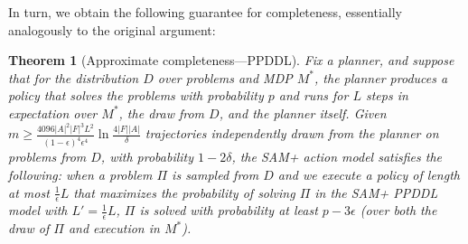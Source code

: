 \documentclass[letterpaper]{article} %
\newtheorem{theorem}{Theorem}
\begin{document}
In turn, we obtain the following guarantee for completeness, essentially analogously to the original argument:
\begin{theorem}[Approximate completeness---PPDDL]
\label{thm:ppddl-sam-ac}
Fix a planner, and suppose that for the distribution $D$ over problems and MDP $M^*$, the planner produces a policy that solves the problems with probability $p$ and runs for $L$ steps in expectation over $M^*$, the draw from $D$, and the planner itself.
Given 
$
m\geq \frac{4096|A|^2|F|^3L^2}{(1-\epsilon)^4\epsilon^4}\ln\frac{4|F||A|}{\delta}
$
trajectories independently drawn from the planner on problems from $D$, with probability $1-2\delta$, the SAM+ action model satisfies the following:  when a problem $\Pi$ is sampled from $D$ and we execute a policy of length at most $\frac{1}{\epsilon}L$ that maximizes the probability of solving $\Pi$ in the SAM+ PPDDL model with $L'=\frac{1}{\epsilon}L$, $\Pi$ is solved with probability at least $p-3\epsilon$ (over both the draw of $\Pi$ and execution in $M^*$).
\end{theorem}


%
% 
%
%
%
%
%
%
%
%
\end{document}
